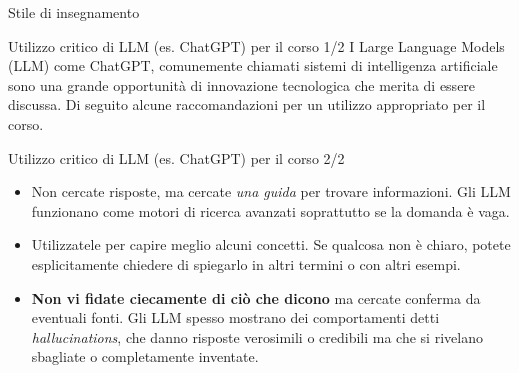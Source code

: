 \documentclass[
  ignorenonframetext,
  aspectratio=169,
]{beamer}
\begin{document}
\begin{frame}{Stile di insegnamento}
\label{stile-di-insegnamento}
\begin{center}
\end{center}
\end{frame}

\begin{frame}{Utilizzo critico di LLM (es. ChatGPT) per il corso 1/2}
\label{utilizzo-critico-di-llm-es.-chatgpt-per-il-corso-12}
I Large Language Models (LLM) come ChatGPT, comunemente chiamati sistemi
di intelligenza artificiale sono una grande opportunità di innovazione
tecnologica che merita di essere discussa. Di seguito alcune
raccomandazioni per un utilizzo appropriato per il corso.
\end{frame}

\begin{frame}{Utilizzo critico di LLM (es. ChatGPT) per il corso 2/2}
\label{utilizzo-critico-di-llm-es.-chatgpt-per-il-corso-22}
\begin{itemize}
\item
  Non cercate risposte, ma cercate \emph{una guida} per trovare
  informazioni. Gli LLM funzionano come motori di ricerca avanzati
  soprattutto se la domanda è vaga.
\item
  Utilizzatele per capire meglio alcuni concetti. Se qualcosa non è
  chiaro, potete esplicitamente chiedere di spiegarlo in altri termini o
  con altri esempi.
\item
  \textbf{Non vi fidate ciecamente di ciò che dicono} ma cercate
  conferma da eventuali fonti. Gli LLM spesso mostrano dei comportamenti
  detti \emph{hallucinations}, che danno risposte verosimili o credibili
  ma che si rivelano sbagliate o completamente inventate.
\end{itemize}
\end{frame}
\end{document}
